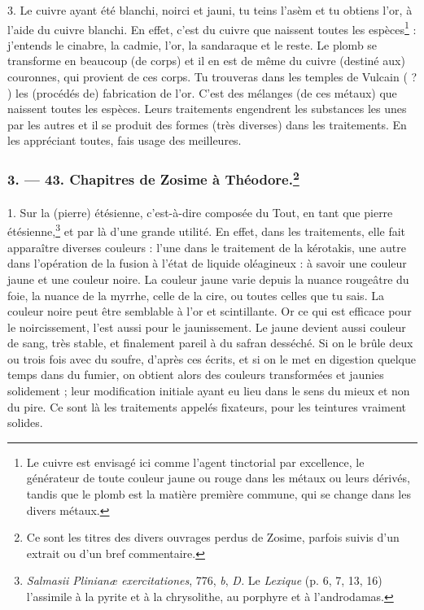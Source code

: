 \documentclass[landscape, a4paper, 11pt, oneside, polutonikogreek, french]{article}
\begin{document}
3. Le cuivre ayant été blanchi, noirci et jauni, tu teins l'asèm et tu obtiens l'or, à l'aide du cuivre blanchi. En effet, c'est du cuivre que naissent toutes les espèces\footnote{Le cuivre est envisagé ici comme l'agent tinctorial par excellence, le générateur de toute couleur jaune ou rouge dans les métaux ou leurs dérivés, tandis que le plomb est la matière première commune, qui se change dans les divers métaux.} : j'entends le cinabre, la cadmie, l'or, la sandaraque et le reste. Le plomb se transforme en beaucoup (de corps) et il en est de même du cuivre (destiné aux) couronnes, qui provient de ces corps. Tu trouveras dans les temples de Vulcain ( ? ) les (procédés de) fabrication de l'or. C'est des mélanges (de ces métaux) que naissent toutes les espèces. Leurs traitements engendrent les substances les unes par les autres et il se produit des formes (très diverses) dans les traitements. En les appréciant toutes, fais usage des meilleures.

\bigskip
\centerline{\EightStarTaper}
\centerline{\EightStarTaper\EightStarTaper}
\bigskip

\subsubsection[3. --- 43. Chapitres de Zosime à Théodore.]{3. --- 43. Chapitres de Zosime à Théodore.\footnote{Ce sont les titres des divers ouvrages perdus de Zosime, parfois suivis d'un extrait ou d'un bref commentaire.}}
\paragraph{}
1. Sur la (pierre) étésienne, c'est-à-dire composée du Tout, en tant que pierre étésienne,\footnote{\emph{Salmasii Plinianæ exercitationes}, 776, \emph{b}, \emph{D.} Le \emph{Lexique} (p. 6, 7, 13, 16) l'assimile à la pyrite et à la chrysolithe, au porphyre et à l'androdamas.} et par là d'une grande utilité. En effet, dans les traitements, elle fait apparaître diverses couleurs : l'une dans le traitement de la kérotakis, une autre dans l'opération de la fusion à l'état de liquide oléagineux : à savoir une couleur jaune et une couleur noire. La couleur jaune varie depuis la nuance rougeâtre du foie, la nuance de la myrrhe, celle de la cire, ou toutes celles que tu sais. La couleur noire peut être semblable à l'or et scintillante. Or ce qui est efficace pour le noircissement, l'est aussi pour le jaunissement. Le jaune devient aussi couleur de sang, très stable, et finalement pareil à du safran desséché. Si on le brûle deux ou trois fois avec du soufre, d'après ces écrits, et si on le met en digestion quelque temps dans du fumier, on obtient alors des couleurs transformées et jaunies solidement ; leur modification initiale ayant eu lieu dans le sens du mieux et non du pire. Ce sont là les traitements appelés fixateurs, pour les teintures vraiment solides.
\end{document}
